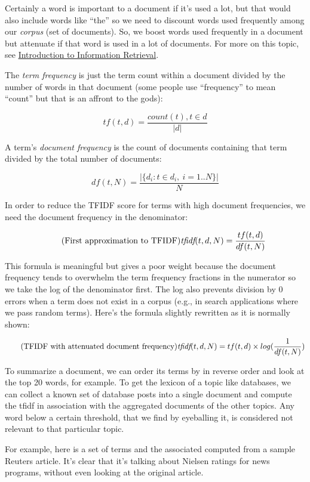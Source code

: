 \begin{fullwidth}
Certainly a word is important to a document if it's used a lot, but that would also include words like ``the'' so we need to discount words used frequently among our {\em corpus} (set of documents). So, we boost words used frequently in a document but attenuate if that word is used  in a lot of documents.  For more on this topic, see \href{http://nlp.stanford.edu/IR-book/html/htmledition/term-frequency-and-weighting-1.html}{Introduction to Information Retrieval}.

The {\em term frequency} is just the term count within a document divided by the number of words in that document (some people use ``frequency'' to mean ``count'' but that is an affront to the gods):

\[\tag{Term frequency of term $t$, document $d$}
tf(t,d) = \frac{count(t), t \in d}{|d|}
\]

A term's {\em document frequency} is the count of documents containing that term divided by the total number of documents:

\[\tag{Document frequency of $t$ in $N$ documents}
df(t,N) = \frac{|\{d_i : t \in d_i, \ i = 1..N\}|}{N}
\]

In order to reduce the TFIDF score for terms with high document frequencies, we need the document frequency  in the denominator:

\[\tag{First approximation to TFIDF}
\text{\em tfidf}(t,d,N) = \frac{tf(t,d)}{df(t,N)}
\]

This formula is  meaningful but gives a poor weight because the document frequency tends to overwhelm the term frequency fractions in the numerator so we take the log of the denominator first. The log also prevents division by 0 errors when a term does not exist in a corpus (e.g., in search applications where we pass random terms). Here's the formula slightly rewritten as it is normally shown:

\[\tag{TFIDF with attenuated document frequency}
\text{\em tfidf}(t,d,N) = tf(t,d) \times log(\frac{1}{df(t,N)})
\]

To summarize a document, we can order its terms by  in reverse order and look at the top 20 words, for example.  To get the lexicon of a topic like databases, we can collect a known set of database posts into a single document and compute the tfidf in association with the aggregated documents of the other topics. Any word below a certain threshold, that we find by eyeballing it, is considered not relevant to that particular topic.

For example, here is a set of terms and the associated  computed from a sample Reuters article. It's clear that it's talking about Nielsen ratings for news programs, without even looking at the original article.


\end{fullwidth}
